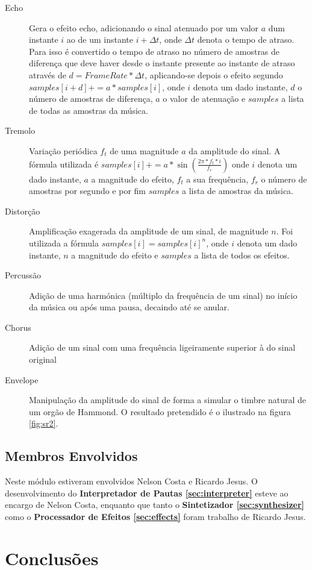 \documentclass[a4paper,11pt,openright,oneside]{report}
\begin{document}
\begin{description}
\item[Echo] Gera o efeito echo, adicionando o sinal atenuado por um valor $a$ dum instante $i$ ao de um instante $i + \Delta t$, onde $\Delta t$ denota o tempo de atraso. Para isso é convertido o tempo de atraso no número de amostras de diferença que deve haver desde o instante presente ao instante de atraso através de $d = FrameRate * \Delta t$, aplicando-se depois o efeito segundo $samples[i + d] += a * samples[i]$, onde $i$ denota um dado instante, $d$ o número de amostras de diferença, $a$ o valor de atenuação e $samples$ a lista de todas as amostras da música.
\item[Tremolo] Variação periódica $f_t$ de uma magnitude $a$ da amplitude do sinal. A fórmula utilizada é $samples[i] += a * \sin(\frac{2\pi * f_t * i}{f_r})$ onde $i$ denota um dado instante, $a$ a magnitude do efeito, $f_t$ a sua frequência, $f_r$ o número de amostras por segundo e por fim $samples$ a lista de amostras da música.
\item[Distorção] Amplificação exagerada da amplitude de um sinal, de magnitude $n$. Foi utilizada a fórmula $samples[i] = samples[i]^n$, onde $i$ denota um dado instante, $n$ a magnitude do efeito e $samples$ a lista de todos os efeitos. 
\item[Percussão] Adição de uma harmónica (múltiplo da frequência de um sinal) no início da música ou após uma pausa, decaindo até se anular.
\item[Chorus] Adição de um sinal com uma frequência ligeiramente superior à do sinal original
\item[Envelope] Manipulação da amplitude do sinal de forma a simular o timbre natural de um orgão de Hammond. O resultado pretendido é o ilustrado na figura \ref{fig:sr2}.
\end{description}

\section*{Membros Envolvidos}

Neste módulo estiveram envolvidos Nelson Costa e Ricardo Jesus. O desenvolvimento do \textbf{Interpretador de Pautas \ref{sec:interpreter}} esteve ao encargo de Nelson Costa, enquanto que tanto o \textbf{Sintetizador \ref{sec:synthesizer}} como o \textbf{Processador de Efeitos \ref{sec:effects}} foram trabalho de Ricardo Jesus.

\chapter{Conclusões}
\label{chap.conclusões}
\end{document}
